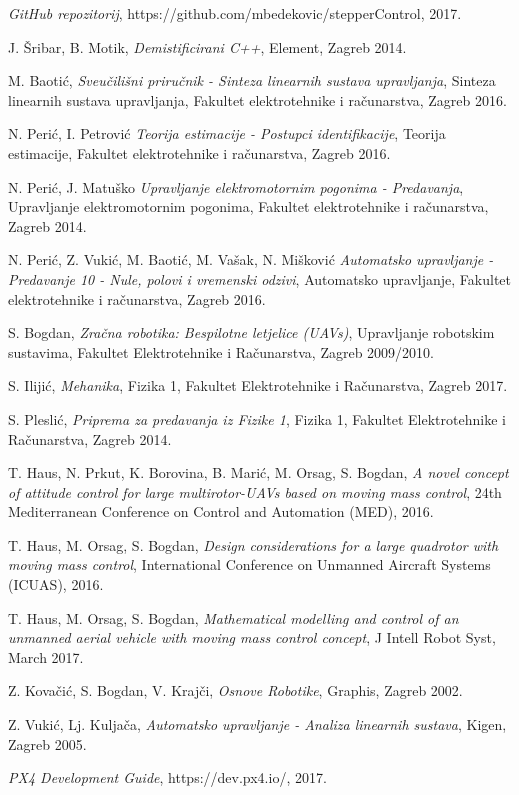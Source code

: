 \documentclass[11pt,a4paper]{article}
\begin{document}

\begin{thebibliography}{9}
	
  \emph{GitHub repozitorij}, https://github.com/mbedekovic/stepperControl,
  2017.
 
 J. Šribar, B. Motik,
 \emph{Demistificirani C++},
 Element,
 Zagreb 2014.
 
  M. Baotić,
  \emph{Sveučilišni priručnik - Sinteza linearnih sustava upravljanja},
  Sinteza linearnih sustava upravljanja, Fakultet elektrotehnike i računarstva,
  Zagreb 2016. 
  
  N. Perić, I. Petrović
  \emph{Teorija estimacije - Postupci identifikacije},
  Teorija estimacije, Fakultet elektrotehnike i računarstva,
  Zagreb 2016. 
  
  N. Perić, J. Matuško
  \emph{Upravljanje elektromotornim pogonima - Predavanja},
  Upravljanje elektromotornim pogonima, Fakultet elektrotehnike i računarstva,
  Zagreb 2014. 
  
  N. Perić, Z. Vukić, M. Baotić, M. Vašak, N. Mišković
  \emph{Automatsko upravljanje - Predavanje 10 - Nule, polovi i vremenski odzivi},
  Automatsko upravljanje, Fakultet elektrotehnike i računarstva,
  Zagreb 2016.  
  
  S. Bogdan,
  \emph{Zračna robotika: Bespilotne letjelice (UAVs)},
  Upravljanje robotskim sustavima, Fakultet Elektrotehnike i Računarstva,
  Zagreb 2009/2010.
  
  S. Ilijić,
  \emph{Mehanika},
  Fizika 1, Fakultet Elektrotehnike i Računarstva,
  Zagreb 2017.
  
  S. Pleslić,
  \emph{Priprema za predavanja iz Fizike 1},
  Fizika 1, Fakultet Elektrotehnike i Računarstva,
  Zagreb 2014.
  
  T. Haus, N. Prkut, K. Borovina, B. Marić, M. Orsag, S. Bogdan,
  \emph{A novel concept of attitude control for large multirotor-UAVs based on moving mass control},
  24th Mediterranean Conference on Control and Automation (MED),
  2016.
  
  T. Haus, M. Orsag, S. Bogdan,
  \emph{Design considerations for a large quadrotor with moving mass control},
  International Conference on Unmanned Aircraft Systems (ICUAS),
  2016.
 
  T. Haus, M. Orsag, S. Bogdan,
  \emph{Mathematical modelling and control of an unmanned aerial vehicle with moving mass control concept},
  J Intell Robot Syst,
  March 2017. 
  
  Z. Kovačić, S. Bogdan, V. Krajči,
  \emph{Osnove Robotike},
  Graphis,
  Zagreb 2002.
 
  Z. Vukić, Lj. Kuljača,
  \emph{Automatsko upravljanje - Analiza linearnih sustava},
  Kigen,
  Zagreb 2005.
  
  \emph{PX4 Development Guide}, https://dev.px4.io/,
  2017.

  
  
\end{thebibliography}
\end{document}
